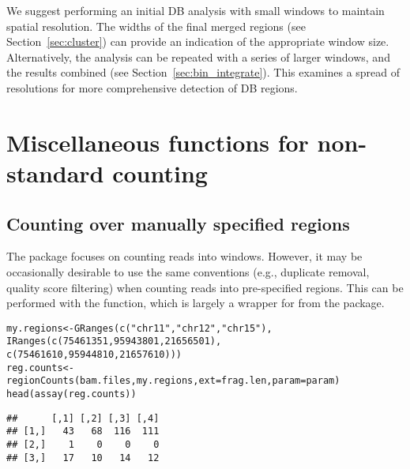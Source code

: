 \documentclass{report}\usepackage[]{graphicx}\usepackage[usenames,dvipsnames]{color}
\newcommand{\hlnum}[1]{\textcolor[rgb]{0.816,0.125,0.439}{#1}}%
\newcommand{\hlstr}[1]{\textcolor[rgb]{0.251,0.627,0.251}{#1}}%
\newcommand{\hlstd}[1]{\textcolor[rgb]{0.251,0.251,0.251}{#1}}%
\newcommand{\hlkwb}[1]{\textcolor[rgb]{0,0,0}{#1}}%
\newcommand{\hlkwc}[1]{\textcolor[rgb]{0.251,0.251,0.251}{#1}}%
\newcommand{\hlkwd}[1]{\textcolor[rgb]{0.878,0.439,0.125}{#1}}%
\newenvironment{knitrout}{}{} %
\begin{document}
We suggest performing an initial DB analysis with small windows to maintain spatial resolution.
The widths of the final merged regions (see Section~\ref{sec:cluster}) can provide an indication of the appropriate window size.
Alternatively, the analysis can be repeated with a series of larger windows, and the results combined (see Section~\ref{sec:bin_integrate}).
This examines a spread of resolutions for more comprehensive detection of DB regions.

\section{Miscellaneous functions for non-standard counting}

\subsection{Counting over manually specified regions}
The  package focuses on counting reads into windows. 
However, it may be occasionally desirable to use the same conventions (e.g., duplicate removal, quality score filtering) when counting reads into pre-specified regions. 
This can be performed with the  function, which is largely a wrapper for  from the  package.

\begin{knitrout}
\color{fgcolor}\begin{kframe}
\begin{alltt}
\hlstd{my.regions} \hlkwb{<-} \hlkwd{GRanges}\hlstd{(}\hlkwd{c}\hlstd{(}\hlstr{"chr11"}\hlstd{,} \hlstr{"chr12"}\hlstd{,} \hlstr{"chr15"}\hlstd{),}
                      \hlkwd{IRanges}\hlstd{(}\hlkwd{c}\hlstd{(}\hlnum{75461351}\hlstd{,} \hlnum{95943801}\hlstd{,} \hlnum{21656501}\hlstd{),}
                      \hlkwd{c}\hlstd{(}\hlnum{75461610}\hlstd{,} \hlnum{95944810}\hlstd{,} \hlnum{21657610}\hlstd{)))}
\hlstd{reg.counts} \hlkwb{<-} \hlkwd{regionCounts}\hlstd{(bam.files, my.regions,} \hlkwc{ext}\hlstd{=frag.len,} \hlkwc{param}\hlstd{=param)}
\hlkwd{head}\hlstd{(}\hlkwd{assay}\hlstd{(reg.counts))}
\end{alltt}
\begin{verbatim}
##      [,1] [,2] [,3] [,4]
## [1,]   43   68  116  111
## [2,]    1    0    0    0
## [3,]   17   10   14   12
\end{verbatim}
\end{kframe}
\end{knitrout}
\end{document}
